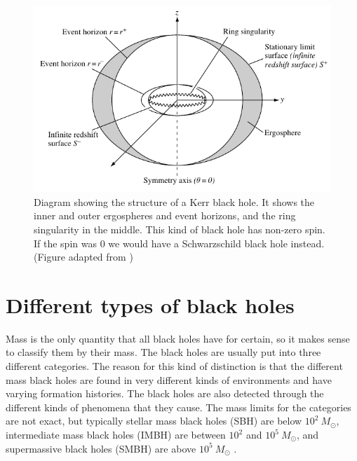 \documentclass[english, oneside]{HYgradu}
\begin{document}
\begin{figure}
\centering
\includegraphics[width=\textwidth]{../images/kerrhole.pdf}
\caption{Diagram showing the structure of a Kerr black hole. It shows the inner and outer ergospheres and event horizons, and the ring singularity in the middle. This kind of black hole has non-zero spin. If the spin was 0 we would have a Schwarzschild black hole instead.
(Figure adapted from \citealt{grintro})}
\label{fig:KerrHole}
\end{figure}




\newpage
\section{Different types of black holes}

Mass is the only quantity that all black holes have for certain, so it makes sense to classify them by their mass. The black holes are usually put into three different categories. The reason for this kind of distinction is that the different mass black holes are found in very different kinds of environments and have varying formation histories. The black holes are also detected through the different kinds of phenomena that they cause. %
The mass limits for the categories are not exact, but typically stellar mass black holes (SBH) are below $10^2 \ M_\odot$, intermediate mass black holes (IMBH) are between $10^2$ and $10^5 \ M_\odot$, and supermassive black holes (SMBH) are above $10^5 \ M_\odot$ \citep{bhphysics}.
\end{document}
